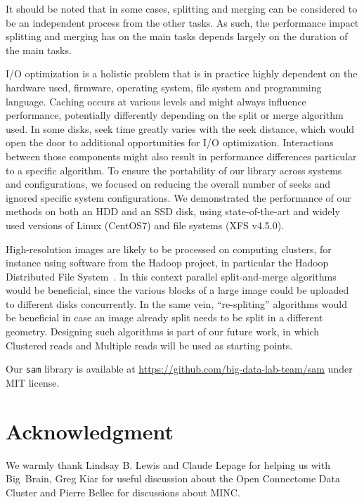 \documentclass[10pt, conference, compsocconf]{IEEEtran}
\begin{document}
It should be noted that in some cases, splitting and merging can be considered to be an independent process
from the other tasks. As such, the performance impact splitting and 
merging has on the main tasks depends largely on the duration of the main tasks. 

I/O optimization is a holistic problem that is in practice highly
dependent on the hardware used, firmware, operating system, file
system and programming language. Caching occurs at various levels and
might always influence performance, potentially differently depending
on the split or merge algorithm used. In some disks, seek time greatly
varies with the seek distance, which would open the door to additional
opportunities for I/O optimization. Interactions between those
components might also result in performance differences particular to
a specific algorithm. To ensure the portability of our library
across systems and configurations, we focused on reducing the overall
number of seeks and ignored specific system configurations. We
demonstrated the performance of our methods on both an HDD and an SSD
disk, using state-of-the-art and widely used versions of Linux
(CentOS7) and file systems (XFS v4.5.0).


High-resolution images are likely to be processed on computing
clusters, for instance using software from the Hadoop project, in
particular the Hadoop Distributed File
System~\cite{shvachko2010hadoop}. In this context parallel
split-and-merge algorithms would be beneficial, since the various
blocks of a large image could be uploaded to different disks
concurrently. In the same vein, ``re-spliting'' algorithms would be
beneficial in case an image already split needs to be split in a
different geometry. Designing such algorithms is part of our future
work, in which Clustered reads and Multiple reads will be used as
starting points.

Our \texttt{sam} library is available at
\url{https://github.com/big-data-lab-team/sam} under MIT license.


\section*{Acknowledgment}
We warmly thank Lindsay B. Lewis and Claude Lepage for helping us with
Big~Brain, Greg Kiar for useful discussion about the Open Connectome
Data Cluster and Pierre Bellec for discussions about MINC.



\end{document}
